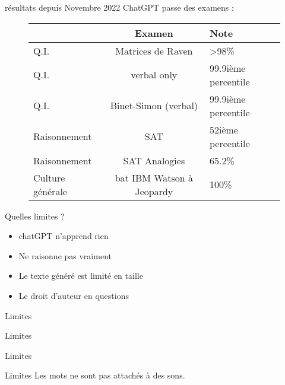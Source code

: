 \begin{frame}{résultats depuis Novembre 2022}
  ChatGPT passe des examens :
  \begin{figure}
    \centering
    \begin{tabular}{lcl}
      \toprule
              & Examen                               & Note  \\
      \midrule
      Q.I. & Matrices de Raven &	>98\% \\
      Q.I. & verbal only & 99.9ième percentile \\
      Q.I. & Binet-Simon (verbal) & 99.9ième percentile \\
      Raisonnement &  SAT & 52ième percentile \\
      Raisonnement & SAT Analogies &	65.2\% \\
      Culture générale & bat IBM Watson à Jeopardy\! &	100\% \\
      \bottomrule
    \end{tabular}
  \end{figure}
\end{frame}

\begin{frame}{Quelles limites ?}
  \begin{itemize}
    \item chatGPT n'apprend rien 
    \item Ne raisonne pas vraiment
    \item Le texte généré est limité en taille
    \item Le droit d'auteur en questions
  \end{itemize} 
\end{frame}

\begin{frame}{Limites}
\end{frame}

\begin{frame}{Limites}
\end{frame}

\begin{frame}{Limites}
\end{frame}

\begin{frame}{Limites}
  Les mots ne sont pas attachés à des sons.
\end{frame}

